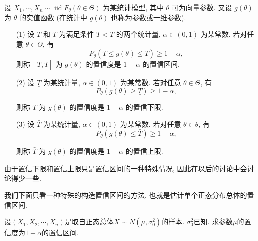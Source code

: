 \begin{definition}
    设 $X_1, \cdots, X_n \sim \operatorname{iid} F_\theta(\theta \in \Theta)$ 为某统计模型, 其中 $\theta$ 可为向量参数. 又设 $g(\theta)$ 为 $\theta$ 的实值函数 (在统计中 $g(\theta)$ 也称为参数或一维参数).

    \begin{itemize}
        \item [(1)] 设 $\underline{T}$ 和 $\bar{T}$ 为满足条件 $\underline{T}<\bar{T}$ 的两个统计量, $\alpha \in(0,1)$ 为某常数. 若对任意 $\theta \in \Theta$, 有
        $$
        P_\theta(\underline{T} \leqslant g(\theta) \leqslant \bar{T}) \geqslant 1-\alpha,
        $$
        则称 $[\underline T, \bar{T}]$ 为 $g(\theta)$ 的置信度是 $1-\alpha$ 的置信区间.
        \item [(2)] 设 $\underline T$ 为某统计量, $\alpha \in(0,1)$ 为某常数. 若对任意 $\theta \in \Theta$, 有
        $$
        P_\theta(g(\theta) \geqslant \underline{T}) \geqslant 1-\alpha,
        $$
        
        则称 $\underline T$ 为 $g(\theta)$ 的置信度是 $1-\alpha$ 的置信下限.
        \item [(3)] 设 $\bar{T}$ 为某统计量, $\alpha \in(0,1)$ 为某常数. 若对任意 $\theta \in \theta$, 有
        $$
        P_\theta(g(\theta) \leqslant \bar{T}) \geqslant 1-\alpha,
        $$
        
        则称 $\bar{T}$ 为 $g(\theta)$ 的置信度是 $1-\alpha$ 的置信上限.
    \end{itemize}
\end{definition}
由于置信下限和置信上限只是置信区间的一种特殊情况, 因此在以后的讨论中会讨论得少一些. 

我们下面只看一种特殊的构造置信区间的方法. 也就是估计单个正态分布总体的置信区间.

\begin{example}
    设$(X_1, X_2, \cdots, X_n)$是取自正态总体$X\sim N(\mu, \sigma_0^2)$的样本. $\sigma_0^2$已知. 求参数$\mu$的置信度为$1-\alpha$的置信区间.
\end{example}




